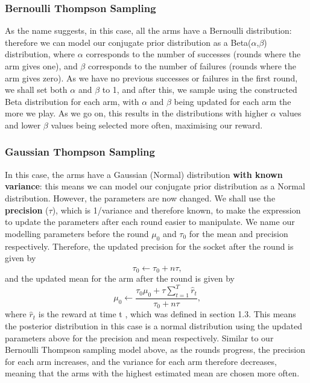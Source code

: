     \subsubsection{Bernoulli Thompson Sampling}
    As the name suggests, in this case, all the arms have a Bernoulli distribution: therefore we can model our conjugate prior distribution as a Beta($\alpha$,$\beta$) distribution, where $\alpha$ corresponds to the number of successes (rounds where the arm gives one), and $\beta$ corresponds to the number of failures (rounds where the arm gives zero). As we have no previous successes or failures in the first round, we shall set both $\alpha$ and $\beta$ to 1, and after this, we sample using the constructed Beta distribution for each arm, with $\alpha$ and $\beta$ being updated for each arm the more we play. As we go on, this results in the distributions with higher $\alpha$ values and lower $\beta$ values being selected more often, maximising our reward.

    \subsubsection{Gaussian Thompson Sampling}
    In this case, the arms have a Gaussian (Normal) distribution \textbf{with known variance}: this means we can model our conjugate prior distribution as a Normal distribution.
    However, the parameters are now changed.
    We shall use the \textbf{precision} ($\tau$), which is 1/variance and therefore known, to make the expression to update the parameters after each round easier to manipulate.
    We name our modelling parameters before the round $\mu_0$ and $\tau_0$ for the mean and precision respectively.
    Therefore, the updated precision for the socket after the round is given by
    \[\tau_0\xleftarrow{}\tau_0 + n\tau\text{,}\]
    and the updated mean for the arm after the round is given by
    \[\mu_0\xleftarrow{}\frac{\tau_0\mu_0 + \tau\sum_{t=1}^T\widehat{r}_t}{\tau_0 + n\tau}\text{,}\]
    where $\widehat{r}_t$ is the reward at time t \citep{agrawal2013further}, which was defined in section 1.3. This means the posterior distribution in this case is a normal distribution using the updated parameters above for the precision and mean respectively.
    Similar to our Bernoulli Thompson sampling model above, as the rounds progress, the precision for each arm increases, and the variance for each arm therefore decreases, meaning that the arms with the highest estimated mean are chosen more often.

